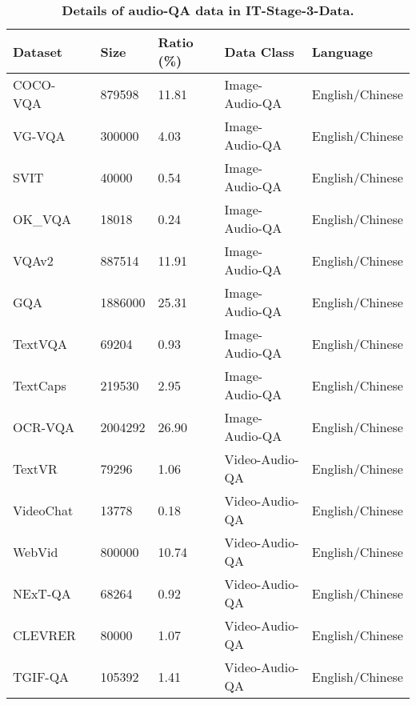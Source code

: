 \begin{table}[h]
\centering
\caption{\textbf{Details of audio-QA data in IT-Stage-3-Data.}
}
\label{tab:appendix_sft_s3_audioqa}
\setlength{\tabcolsep}{8pt}
\begin{tabular}{l|l|l|l|l}
\toprule
Dataset   & Size    & Ratio (\%) & Data Class     & Language        \\
\midrule
COCO-VQA~\cite{ren2015exploring}  & 879598  & 11.81  & Image-Audio-QA & English/Chinese \\
VG-VQA~\cite{reich2024uncoveringpotentialvisualgrounding}    & 300000  & 4.03  & Image-Audio-QA & English/Chinese \\
SVIT~\cite{zhao2023svit}      & 40000   & 0.54  & Image-Audio-QA & English/Chinese \\
OK\_VQA~\cite{marino2019ok}   & 18018   & 0.24  & Image-Audio-QA & English/Chinese \\
VQAv2~\cite{goyal2017making}     & 887514  & 11.91  & Image-Audio-QA & English/Chinese \\
GQA~\cite{hudson2019gqa}       & 1886000 & 25.31  & Image-Audio-QA & English/Chinese \\
TextVQA~\cite{singh2019towards}   & 69204   & 0.93  & Image-Audio-QA & English/Chinese \\
TextCaps~\cite{sidorov2020textcaps}  & 219530  & 2.95   & Image-Audio-QA & English/Chinese \\
OCR-VQA~\cite{mishra2019ocr}   & 2004292 & 26.90  & Image-Audio-QA & English/Chinese \\
TextVR~\cite{wu2023largecrossmodal}    & 79296   & 1.06  & Video-Audio-QA & English/Chinese \\
VideoChat~\cite{li2023videochat} & 13778   & 0.18  & Video-Audio-QA & English/Chinese \\
WebVid~\cite{Bain21}    & 800000  & 10.74  & Video-Audio-QA & English/Chinese \\
NExT-QA~\cite{xiao2021next}   & 68264   & 0.92  & Video-Audio-QA & English/Chinese \\
CLEVRER~\cite{yi2019clevrer}   & 80000   & 1.07  & Video-Audio-QA & English/Chinese \\
TGIF-QA~\cite{yuntgifqa}   & 105392  & 1.41  & Video-Audio-QA & English/Chinese \\
\bottomrule
\end{tabular}
\end{table}
